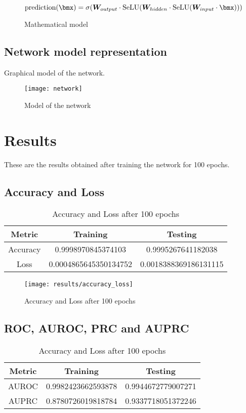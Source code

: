 \begin{figure}
	\[
		\text{prediction}(\bmx) = \sigma(\matr{W}_{output}\cdot\text{SeLU}(\matr{W}_{hidden}\cdot\text{SeLU}(\matr{W}_{input}\cdot\bmx)))
	\]
	\caption{Mathematical model}
\end{figure}

\section{Network model representation}
Graphical model of the network.
\begin{figure}
	\texttt{[image: network]}
	\caption{Model of the network}
\end{figure}

\chapter{Results}

These are the results obtained after training the network for 100 epochs.

\section{Accuracy and Loss}
\begin{table}
	\begin{tabular}{|c|c|c|}
		\hline
		\textbf{Metric} & \textbf{Training}     & \textbf{Testing}      \\
		\hline
		Accuracy        & 0.9998970845374103    & 0.9995267641182038    \\
		\hline
		Loss            & 0.0004865645350134752 & 0.0018388369186131115 \\
		\hline
	\end{tabular}
	\caption{Accuracy and Loss after 100 epochs}
\end{table}

\begin{figure}
	\texttt{[image: results/accuracy\_loss]}
	\caption{Accuracy and Loss after 100 epochs}
\end{figure}

\section{ROC, AUROC, PRC and AUPRC}
\begin{table}
	\begin{tabular}{|c|c|c|}
		\hline
		\textbf{Metric} & \textbf{Training}  & \textbf{Testing}   \\
		\hline
		AUROC           & 0.9982423662593878 & 0.9944672779007271 \\
		\hline
		AUPRC           & 0.8780726019818784 & 0.9337718051372246 \\
		\hline
	\end{tabular}
	\caption{Accuracy and Loss after 100 epochs}
\end{table}

